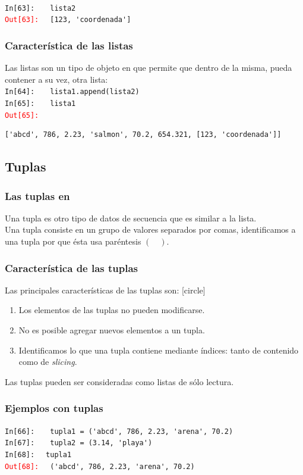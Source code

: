 \documentclass[12pt]{beamer}
\begin{document}
{\begin{frame}[fragile]
\\
\pause
\textcolor{ao}{\texttt{In[63]: }} \verb|  lista2|
\\
\pause
\textcolor{red}{\texttt{Out[63]: }} \verb| [123, 'coordenada']|
\end{frame}
\begin{frame}[fragile]
\frametitle{Característica de las listas}
Las listas son un tipo de objeto en \python{} que permite que dentro de la misma, pueda contener a su vez, otra lista:
\\
\bigskip
\textcolor{ao}{\texttt{In[64]: }} \verb|  lista1.append(lista2)|
\\
\pause
\textcolor{ao}{\texttt{In[65]: }} \verb|  lista1|
\\
\pause
\textcolor{red}{\texttt{Out[65]: }}  
\begin{lstlisting}
['abcd', 786, 2.23, 'salmon', 70.2, 654.321, [123, 'coordenada']]
\end{lstlisting}
\end{frame}
\subsection{Tuplas}
\begin{frame}
\frametitle{Las tuplas en \python}
Una tupla es otro tipo de datos de secuencia que es similar a la lista.
\\
\bigskip
Una tupla consiste en un grupo de valores separados por comas, identificamos a una tupla por que ésta usa paréntesis $( \quad )$.
\end{frame}
\begin{frame}
\frametitle{Característica de las tuplas}
Las principales características de las tuplas son:
[circle]
\begin{enumerate}[<+->]
\item Los elementos de las tuplas no pueden modificarse.
\item No es posible agregar nuevos elementos a un tupla.
\item Identificamos lo que una tupla contiene mediante índices: tanto de contenido como de \emph{slicing}.
\end{enumerate}
\pause
Las tuplas pueden ser consideradas como listas de sólo lectura.
\end{frame}
\begin{frame}[fragile]
\frametitle{Ejemplos con tuplas}
\textcolor{ao}{\texttt{In[66]: }} \verb|  tupla1 = ('abcd', 786, 2.23, 'arena', 70.2)|
\\
\pause
\textcolor{ao}{\texttt{In[67]: }} \verb|  tupla2 = (3.14, 'playa')|
\\
\bigskip
\pause
\textcolor{ao}{\texttt{In[68]: }} \verb| tupla1|
\\
\textcolor{red}{\texttt{Out[68]: }} \verb| ('abcd', 786, 2.23, 'arena', 70.2)|
\end{frame}

}
\end{document}
